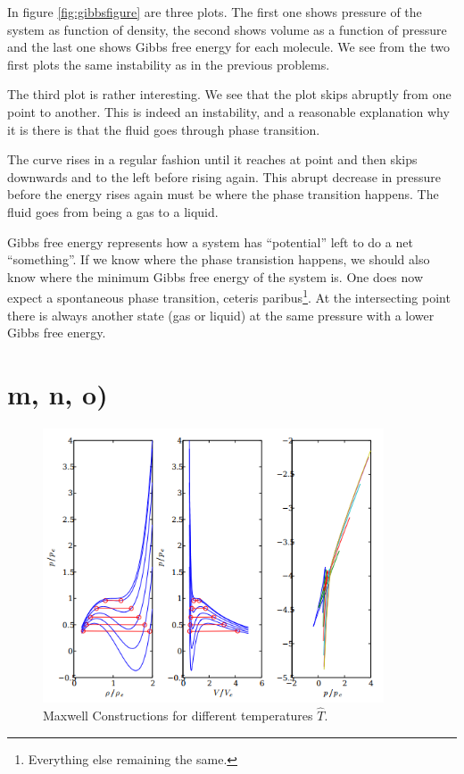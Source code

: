 \documentclass{article}
\begin{document}
In figure \ref{fig:gibbsfigure} are three plots. The first one shows pressure of the system as function of density, the second shows volume as a function of pressure and the last one shows Gibbs free energy for each molecule. We see from the two first plots the same instability as in the previous problems. 

The third plot is rather interesting. We see that the plot skips abruptly from one point to another. This is indeed an instability, and a reasonable explanation why it is there is that the fluid goes through phase transition.

The curve rises in a regular fashion until it reaches at point and then skips downwards and to the left before rising again. This abrupt decrease in pressure before the energy rises again must be where the phase transition happens. The fluid goes from being a gas to a liquid.

Gibbs free energy represents how a system has ``potential'' left to do a net ``something''. If we know where the phase transistion happens, we should also know where the minimum Gibbs free energy of the system is. One does now expect a spontaneous phase transition, ceteris paribus\footnote{Everything else remaining the same.}. At the intersecting point there is always another state (gas or liquid) at the same pressure with a lower Gibbs free energy. 

\section*{m, n, o)}   
\begin{figure}
	\centering
	\includegraphics[width=0.9\textwidth]{figures/maxwellConstruct.png}
	\caption{Maxwell Constructions for different temperatures $\hat{T}$.}
	\label{fig:MaxwellConstruct}
\end{figure}
\end{document}
